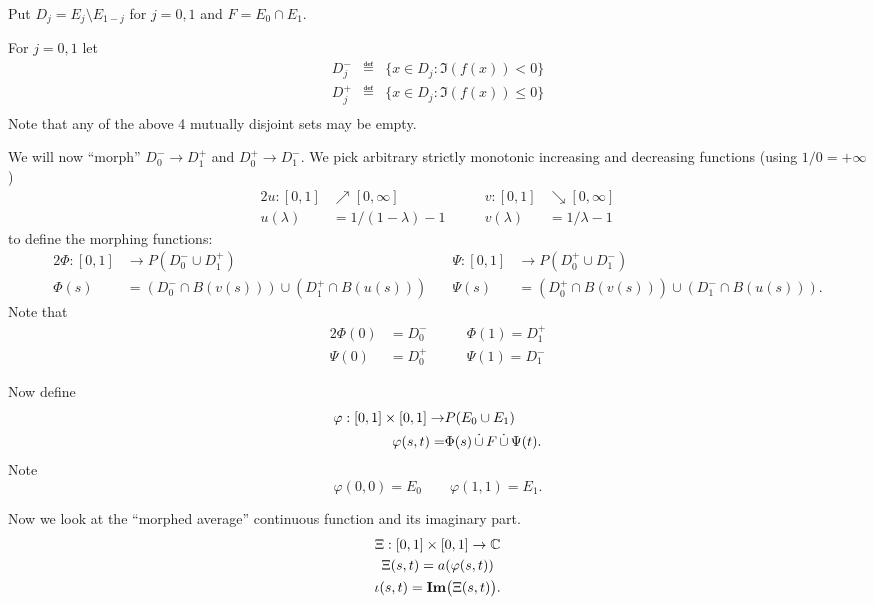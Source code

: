 \begin{thmproof}
Put \(D_j = E_j \setminus E_{1-j}\) for \(j=0,1\) and \(F=E_0\cap E_1\).
\iffalse
Now
\begin{eqnarray*}
a(E_1)-a(E_0)
 &=&
  \frac{1}{m(D_1) + m(F)} \left(\int_{D_1} f\,dm + \int_F f\,dm\right)
  -
  \frac{1}{m(D_0) + m(F)} \left(\int_{D_0} f\,dm + \int_F f\,dm\right)
\end{eqnarray*}
\fi
For \(j=0,1\) let
\begin{eqnarray*}
 D_j^- &\eqdef& \{x\in D_j: \Im(f(x)) < 0\} \\
 D_j^+ &\eqdef& \{x\in D_j: \Im(f(x)) \leq 0\} \\
\end{eqnarray*}
Note that any of the above 4 mutually disjoint sets may be empty.

We will now ``morph'' \(D_0^- \to D_1^+\) and \(D_0^+ \to D_1^-\).
We pick arbitrary strictly monotonic increasing and decreasing functions
(using \(1/0=+\infty\))
\begin{alignat*}{2}
u : [0,1]  &\nearrow [0,\infty]   &\qquad  v : [0,1] &\searrow [0,\infty] \\
u(\lambda) &= 1/(1-\lambda) - 1   &\qquad  v(\lambda)  &= 1/\lambda - 1
\end{alignat*}
to define the morphing functions:
\begin{alignat*}{2}
\Phi: [0,1] &\to P(D_0^-\cup D_1^+)
          &\quad \Psi: [0,1] &\to P(D_0^+\cup D_1^-) \\
\Phi(s) &=
  \left(D_0^- \cap B(v(s))\right)
  \cup
  \left(D_1^+ \cap B(u(s))\right)
  &\quad
\Psi(s) &=
  \left(D_0^+ \cap B(v(s))\right)
  \cup
  \left(D_1^- \cap B(u(s))\right).
\end{alignat*}
Note that
\begin{alignat*}{2}
\Phi(0) &= D_0^-  &\qquad  \Phi(1) = D_1^+ \\
\Psi(0) &= D_0^+  &\qquad  \Psi(1) = D_1^-
\end{alignat*}

Now define
\begin{eqnarray*}
\varphi : [0,1]\times[0,1] \to &P(E_0\cup E_1) \\
\varphi(s,t) = &\Phi(s) \disjunion F \disjunion \Psi(t).
\end{eqnarray*}
Note
\begin{equation} \label{eq:llem:av:cvx:E01}
\varphi(0,0) = E_0 \qquad \varphi(1,1) = E_1.
\end{equation}

Now we look at the ``morphed average'' continuous function
and its imaginary part.
\begin{gather*}
\Xi : [0,1]\times[0,1] \to \mathbb{C} \\
\Xi(s,t) = a(\varphi(s,t)) \\
\iota(s,t) = \mathop{\bf Im}\nolimits\bigl(\Xi(s,t)\bigr).
\end{gather*}


\end{thmproof}
